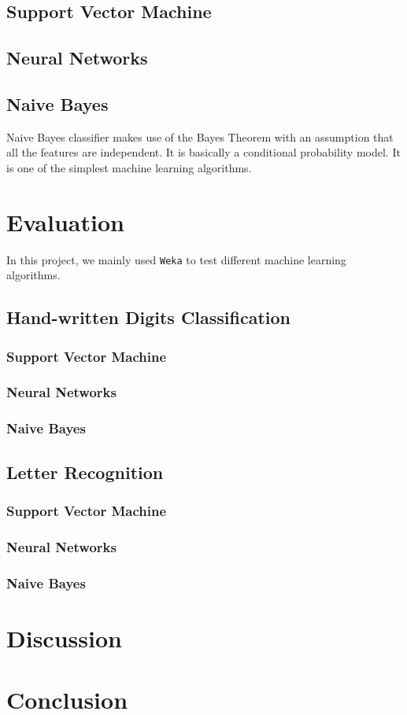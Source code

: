 \documentclass[11pt]{article}
\begin{document}
\subsection{Support Vector Machine}

\subsection{Neural Networks}

\subsection{Naive Bayes}
Naive Bayes classifier makes use of the Bayes Theorem with an assumption that all the features are independent. It is basically a conditional probability model. It is one of the simplest machine learning algorithms.

\section{Evaluation}
In this project, we mainly used \texttt{Weka} \cite{hall2009weka} to test different machine learning algorithms.

\subsection{Hand-written Digits Classification}
\subsubsection{Support Vector Machine}

\subsubsection{Neural Networks}

\subsubsection{Naive Bayes}

\subsection{Letter Recognition}
\subsubsection{Support Vector Machine}

\subsubsection{Neural Networks}

\subsubsection{Naive Bayes}

\section{Discussion}

\section{Conclusion}




\end{document}
